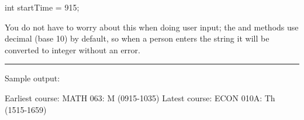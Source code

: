 \begin{exercise}
\begin{minipage}[t]{0.8\textwidth}
\begin{code}
int startTime = 915;
\end{code}

You do not have to worry about this when doing user input; the  and  methods use decimal (base 10) by default, so when a person enters the string  it will be converted to integer without an error.

\noindent\rule{\textwidth}{1pt}

\end{minipage}

Sample output:

\begin{stdout}
Earliest course: MATH 063: M (0915-1035)
Latest course: ECON 010A: Th (1515-1659)
\end{stdout}

\end{exercise}
